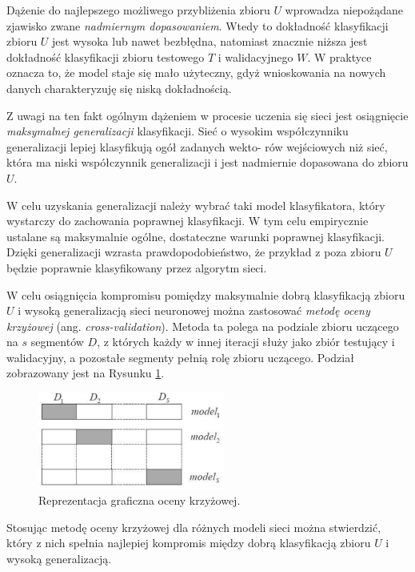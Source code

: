 Dążenie do najlepszego możliwego przybliżenia zbioru $U$ wprowadza niepożądane zjawisko zwane \textit{nadmiernym dopasowaniem}. Wtedy to dokładność klasyfikacji zbioru $U$ jest wysoka lub nawet bezbłędna, natomiast znacznie niższa jest dokładność klasyfikacji zbioru testowego $T$ i walidacyjnego $W$. W praktyce oznacza to, że model staje się mało użyteczny, gdyż wnioskowania na nowych danych charakteryzuję się niską dokładnością.

Z uwagi na ten fakt ogólnym dążeniem w procesie uczenia się sieci jest osiągnięcie \textit{maksymalnej generalizacji} klasyfikacji. Sieć o wysokim współczynniku generalizacji lepiej klasyfikują ogół zadanych wekto-
rów wejściowych niż sieć, która ma niski współczynnik generalizacji i jest nadmiernie dopasowana do zbioru $U$.

W celu uzyskania generalizacji należy wybrać taki model klasyfikatora, który wystarczy do zachowania
poprawnej klasyfikacji. W tym celu empirycznie ustalane są maksymalnie ogólne, dostateczne warunki poprawnej klasyfikacji. Dzięki generalizacji wzrasta prawdopodobieństwo, że przykład z poza zbioru $U$ będzie poprawnie klasyfikowany przez algorytm sieci.

W celu osiągnięcia kompromisu pomiędzy maksymalnie dobrą klasyfikacją zbioru $U$ i wysoką generalizacją sieci neuronowej można zastosować \textit{metodę oceny krzyżowej} (ang. \textit{cross-validation}). Metoda ta polega na podziale zbioru uczącego na $s$ segmentów $D$, z których każdy w innej iteracji służy jako zbiór testujący i walidacyjny, a pozostałe segmenty pełnią rolę zbioru uczącego. Podział zobrazowany jest na Rysunku \ref{cross-validation}.
\begin{figure}[h!]
	\centering
	\includegraphics[width=0.55\textwidth]{figures/cross-validation.png}
	\caption{Reprezentacja graficzna oceny krzyżowej.}
	\label{cross-validation}
\end{figure}

Stosując metodę oceny krzyżowej dla różnych modeli sieci można stwierdzić, który z nich spełnia najlepiej kompromis między dobrą klasyfikacją zbioru $U$ i wysoką generalizacją.

